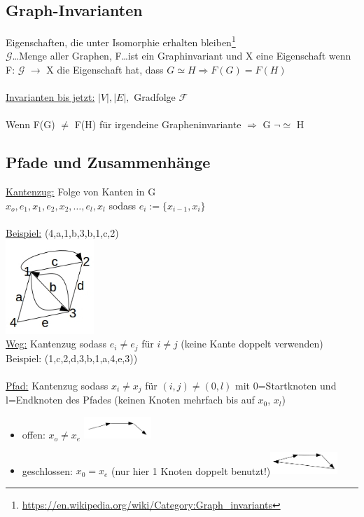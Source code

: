 \subsection{Graph-Invarianten}
Eigenschaften, die unter Isomorphie erhalten bleiben\footnote{\url{https://en.wikipedia.org/wiki/Category:Graph_invariants}}\\
$\mathcal{G}$…Menge aller Graphen, F…ist ein Graphinvariant und X eine Eigenschaft wenn F: $\mathcal{G}$ $\rightarrow$ X die Eigenschaft hat, dass $G \simeq H \Rightarrow F(G) = F(H)$
\\\\
\underline{Invarianten bis jetzt:} $|V|, |E|,$ Gradfolge $\mathcal{F}$\\\\
Wenn F(G) $\neq$ F(H) für irgendeine Grapheninvariante $\Rightarrow$ G $\neg \simeq$ H

\subsection{Pfade und Zusammenhänge}

\underline{Kantenzug:} Folge von Kanten in G\\
$x_o,e_1,x_1,e_2,x_2,…,e_l,x_l$ sodass $e_i:=\{x_{i-1},x_i\}$\\\\
\underline{Beispiel:} (4,a,1,b,3,b,1,c,2)\\
\includegraphics[width=0.25\textwidth]{lectures/161014/pix/10.jpg}\\
\underline{Weg:} Kantenzug sodass $e_i \neq e_j$ für $i \neq j$ (keine Kante doppelt verwenden)\\
Beispiel: (1,c,2,d,3,b,1,a,4,e,3))
\\\\
\underline{Pfad:} Kantenzug sodass $x_i \neq x_j$ für $(i,j) \neq (0,l)$ mit 0=Startknoten und l=Endknoten des Pfades (keinen Knoten mehrfach bis auf $x_0$, $x_l$)
\begin{itemize}
	\item offen: $x_o \neq x_e$ \includegraphics[width=0.2\textwidth]{lectures/161014/pix/11.jpg}
	\item geschlossen: $x_0=x_e$ (nur hier 1 Knoten doppelt benutzt!)\includegraphics[width=0.2\textwidth]{lectures/161014/pix/12.jpg}
\end{itemize}

